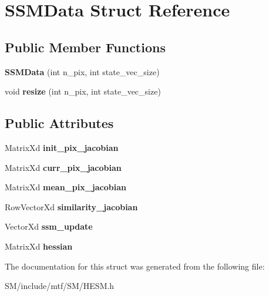 \hypertarget{structSSMData}{\section{S\-S\-M\-Data Struct Reference}
\label{structSSMData}
}
\subsection*{Public Member Functions}
\begin{DoxyCompactItemize}
\item 
\hypertarget{structSSMData_ab2408edb9e9e81a732c3761957e0bcf6}{{\bfseries S\-S\-M\-Data} (int n\-\_\-pix, int state\-\_\-vec\-\_\-size)}\label{structSSMData_ab2408edb9e9e81a732c3761957e0bcf6}

\item 
\hypertarget{structSSMData_a0423d53e4df5ea37cbcc5bc16e6ef561}{void {\bfseries resize} (int n\-\_\-pix, int state\-\_\-vec\-\_\-size)}\label{structSSMData_a0423d53e4df5ea37cbcc5bc16e6ef561}

\end{DoxyCompactItemize}
\subsection*{Public Attributes}
\begin{DoxyCompactItemize}
\item 
\hypertarget{structSSMData_a072d85ef0cd98bc623cd5ce793d78db5}{Matrix\-Xd {\bfseries init\-\_\-pix\-\_\-jacobian}}\label{structSSMData_a072d85ef0cd98bc623cd5ce793d78db5}

\item 
\hypertarget{structSSMData_a1e2b3eecaec8784041f78ea0fa86512d}{Matrix\-Xd {\bfseries curr\-\_\-pix\-\_\-jacobian}}\label{structSSMData_a1e2b3eecaec8784041f78ea0fa86512d}

\item 
\hypertarget{structSSMData_a605adb079bea96d260c2230e55a56838}{Matrix\-Xd {\bfseries mean\-\_\-pix\-\_\-jacobian}}\label{structSSMData_a605adb079bea96d260c2230e55a56838}

\item 
\hypertarget{structSSMData_a0f09c7ff9467718d1aa6ba4a75577272}{Row\-Vector\-Xd {\bfseries similarity\-\_\-jacobian}}\label{structSSMData_a0f09c7ff9467718d1aa6ba4a75577272}

\item 
\hypertarget{structSSMData_ac1d211d35c9342be2f507fa1f0652e74}{Vector\-Xd {\bfseries ssm\-\_\-update}}\label{structSSMData_ac1d211d35c9342be2f507fa1f0652e74}

\item 
\hypertarget{structSSMData_acde4776b87ad20c88ec1e65f13f1e626}{Matrix\-Xd {\bfseries hessian}}\label{structSSMData_acde4776b87ad20c88ec1e65f13f1e626}

\end{DoxyCompactItemize}


The documentation for this struct was generated from the following file\-:\begin{DoxyCompactItemize}
\item 
S\-M/include/mtf/\-S\-M/H\-E\-S\-M.\-h\end{DoxyCompactItemize}
